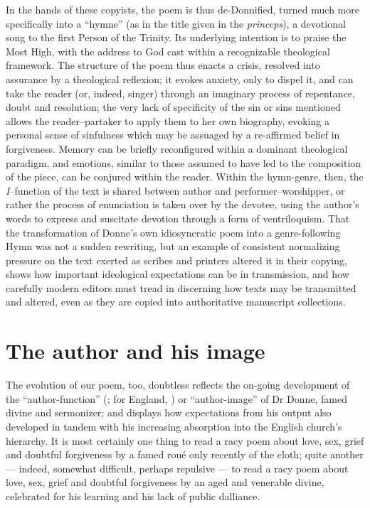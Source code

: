 \begin{paper}
In the hands of these copyists, the poem is thus de-Donnified, turned
much more specifically into a ``hymne'' (as in the title given in the
\emph{princeps}), a devotional song to the first Person of the Trinity.
Its underlying intention is to praise the Most High, with the address to
God cast within a recognizable theological framework. The structure of
the poem thus enacts a crisis, resolved into assurance by a theological
reflexion; it evokes anxiety, only to dispel it, and can take the reader
(or, indeed, singer) through an imaginary process of repentance, doubt
and resolution; the very lack of specificity of the sin or sins
mentioned allows the reader--partaker to apply them to her own
biography, evoking a personal sense of sinfulness which may be assuaged
by a re-affirmed belief in forgiveness. Memory can be briefly
reconfigured within a dominant theological paradigm, and emotions,
similar to those assumed to have led to the composition of the piece,
can be conjured within the reader. Within the hymn-genre, then, the
\emph{I}--function of the text is shared between author and
performer--worshipper, or rather the process of enunciation is taken
over by the devotee, using the author's words to express and suscitate
devotion through a form of ventriloquism. That the transformation of
Donne's own idiosyncratic poem into a genre-following Hymn was not a
sudden rewriting, but an example of consistent normalizing pressure on
the text exerted as scribes and printers altered it in their copying,
shows how important ideological expectations can be in transmission, and
how carefully modern editors must tread in discerning how texts may be
transmitted and altered, even as they are copied into authoritative
manuscript collections.

\section{The author and his image}

The evolution of our poem, too, doubtless reflects the on-going
development of the ``author-function'' (\citealt{wilson_foucault_2004}; for England,
\citealt{armstrong_paratexts_2007}) or ``author-image'' \citep{amossy_double_2009} of Dr Donne, famed
divine and sermonizer; and displays how expectations from his output
also developed in tandem with his increasing absorption into the English
church's hierarchy. It is most certainly one thing to read a racy poem
about love, sex, grief and doubtful forgiveness by a famed roué only
recently of the cloth; quite another --- indeed, somewhat difficult,
perhaps repulsive --- to read a racy poem about love, sex, grief and
doubtful forgiveness by an aged and venerable divine, celebrated for his
learning and his lack of public dalliance.


\end{paper}
